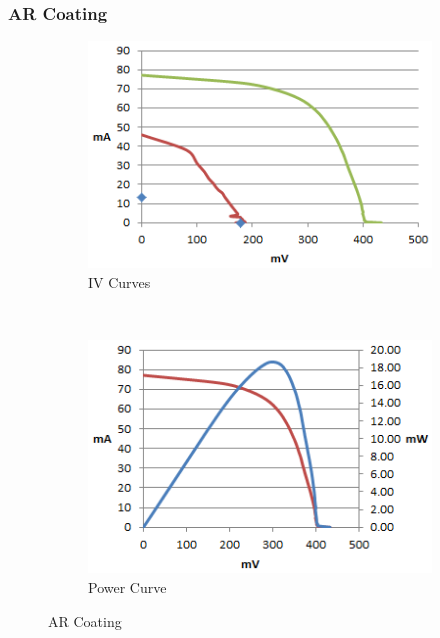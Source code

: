 \documentclass[letter,12pt]{article}
\begin{document}
		\FloatBarrier
		\subsubsection{AR Coating}
		
			\begin{figure}[h!]
				\centering
				\begin{subfigure}[b]{.45\textwidth}
					\includegraphics[width=\textwidth]{./Images/IV_Curves/Alt_AR_IV.png}
					\caption{IV Curves}
				\end{subfigure}
				~
				\begin{subfigure}[b]{.45\textwidth}
					\includegraphics[width=\textwidth]{./Images/IV_Curves/Alt_AR_PV.png}
					\caption{Power Curve}
				\end{subfigure}
				
				\caption{AR Coating}
				\label{fig:Alt_AR_Coating}
			\end{figure}
			
\end{document}
